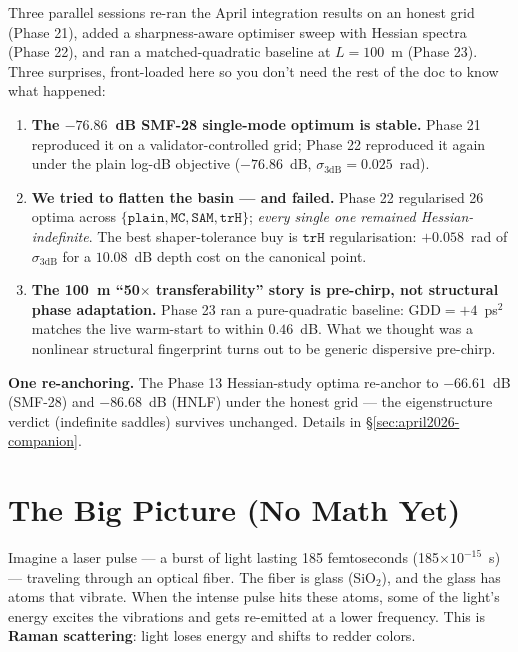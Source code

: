 \documentclass[12pt,a4paper]{article}
\begin{document}
\begin{tcolorbox}[colback=yellow!8,colframe=orange!60!black,title=\textbf{Overnight update --- 2026-04-19/20}]
Three parallel sessions re-ran the April integration results on an
honest grid (Phase 21), added a sharpness-aware optimiser sweep with
Hessian spectra (Phase 22), and ran a matched-quadratic baseline at
$L=100$~m (Phase 23). Three surprises, front-loaded here so you don't
need the rest of the doc to know what happened:
\begin{enumerate}[leftmargin=*,topsep=2pt]
  \item \textbf{The $-76.86$~dB SMF-28 single-mode optimum is stable.}
        Phase 21 reproduced it on a validator-controlled grid; Phase 22
        reproduced it again under the plain log-dB objective
        ($-76.86$~dB, $\sigma_{3\text{dB}}=0.025$~rad).
  \item \textbf{We tried to flatten the basin --- and failed.}
        Phase 22 regularised 26 optima across $\{\texttt{plain},
        \texttt{MC}, \texttt{SAM}, \texttt{trH}\}$; \emph{every single
        one remained Hessian-indefinite}. The best shaper-tolerance buy is
        $\texttt{trH}$ regularisation: $+0.058$~rad of $\sigma_{3\text{dB}}$
        for a $10.08$~dB depth cost on the canonical point.
  \item \textbf{The 100~m ``50$\times$ transferability'' story is
        pre-chirp, not structural phase adaptation.}
        Phase 23 ran a pure-quadratic baseline: $\text{GDD}=+4$~ps$^2$
        matches the live warm-start to within $0.46$~dB. What we
        thought was a nonlinear structural fingerprint turns out to be
        generic dispersive pre-chirp.
\end{enumerate}
\textbf{One re-anchoring.} The Phase 13 Hessian-study optima re-anchor
to $-66.61$~dB (SMF-28) and $-86.68$~dB (HNLF) under the honest
grid --- the eigenstructure verdict (indefinite saddles) survives
unchanged. Details in §\ref{sec:april2026-companion}.
\end{tcolorbox}

\tableofcontents
\newpage

\section{The Big Picture (No Math Yet)}

Imagine a laser pulse --- a burst of light lasting 185 femtoseconds (185$\times 10^{-15}$~s) --- traveling through an optical fiber. The fiber is glass (SiO$_2$), and the glass has atoms that vibrate. When the intense pulse hits these atoms, some of the light's energy excites the vibrations and gets re-emitted at a lower frequency. This is \textbf{Raman scattering}: light loses energy and shifts to redder colors.
\end{document}
